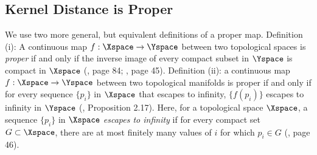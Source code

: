 \documentclass[11pt]{myclass}
\begin{document}
\subsection{Kernel Distance is Proper}

We use two more general, but equivalent definitions of a proper map.  
Definition (i): A continuous map $f: \Xspace \to \Yspace$ between two topological spaces is \emph{proper} if and only if the inverse image of every compact subset in $\Yspace$ is compact in $\Xspace$ (\cite{Lee2000}, page 84; \cite{Lee2003}, page 45). 
Definition (ii): a continuous map $f: \Xspace \to \Yspace$ between two topological manifolds is proper if and only if for every sequence $\{p_i\}$ in $\Xspace$ that escapes to infinity, $\{f(p_i)\}$ escapes to infinity in $\Yspace$ (\cite{Lee2003}, Proposition 2.17).
Here, for a topological space $\Xspace$, a sequence $\{p_i\}$ in $\Xspace$ \emph{escapes to infinity} if for every compact set $G \subset \Xspace$, there are at most finitely many values of $i$ for which $p_i \in G$ (\cite{Lee2003}, page 46). 
\end{document}
